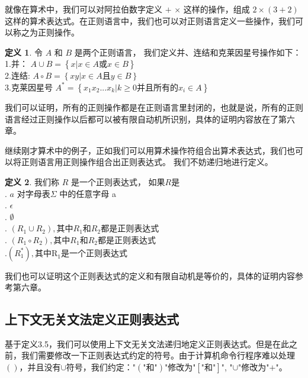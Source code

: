 \documentclass[openany,oneside]{book}
\theoremstyle{definition}
\newtheorem{definition}{\hspace{2em}定义}[chapter]
\begin{document}
	就像在算术中，我们可以对阿拉伯数字定义 \(+\) \(\times\) 这样的操作，组成 \( 2 \times \left( 3 +2\right) \)这样的算术表达式。在正则语言中，我们也可以对正则语言定义一些操作，我们可以称之为正则操作。
	\begin{definition}
		令 \(A\) 和 \(B\) 是两个正则语言， 我们定义并、连结和克莱因星号操作如下：\\
		\indent \indent 1.并： \(A \cup B = \left\lbrace x|x \in A \mbox{或} x \in B \right\rbrace \)\\
		\indent \indent 2.连结: \(A \circ B = \left\lbrace xy| x \in A \mbox{且} y\in B \right\rbrace\)\\
		\indent \indent 3.克莱因星号 \(A^* = \left\lbrace x_1 x_2 ...x_k | k \ge 0 \mbox{并且所有的} x_i \in  A \right\rbrace\)
	\end{definition}
	我们可以证明，所有的正则操作都是在正则语言里封闭的，也就是说，所有的正则语言经过正则操作以后都可以被有限自动机所识别，具体的证明内容放在了第六章。
	
	继续刚才算术中的例子，正如我们可以用算术操作符组合出算术表达式，我们也可以将正则语言用正则操作组合出正则表达式。
	我们不妨递归地进行定义。
	\begin{definition}
		我们称 \(R\) 是一个正则表达式， 如果\(R\)是 \\
		\indent {}. \(a\) 对字母表\(\Sigma\) 中的任意字母 a\\
		\indent {}. \(\epsilon\)\\
		\indent {}. $\emptyset$\\
		\indent {}. \(\left(  R_1 \cup R_2 \right) ,\mbox{其中}R_1\mbox{和}R_2 \mbox{都是正则表达式}  \)\\
		\indent {}. \( \left( R_1 \circ R_2 \right),\mbox{其中}R_1\mbox{和}R_2\mbox{都是正则表达式}\)\\
		\indent {}.\(\left( R_1^* \right) , \mbox{其中R}_1\mbox{是一个正则表达式}\)
	\end{definition}
	我们也可以证明这个正则表达式的定义和有限自动机是等价的，具体的证明内容参考第六章。
	
\subsection{上下文无关文法定义正则表达式}
	基于定义3.5，我们可以使用上下文无关文法递归地定义正则表达式。但是在此之前，我们需要修改一下正则表达式约定的符号。由于计算机命令行程序难以处理\(\left(\right)\)，并且没有\(\cup\)符号，我们约定：\(\mbox{"}\left(\mbox{"和"}\right)\mbox{"}\)修改为\(\mbox{"}\left[  \mbox{"和"}\right]\mbox{"}\), "\(\cup\)"修改为"\(+\)"。
	
\end{document}
